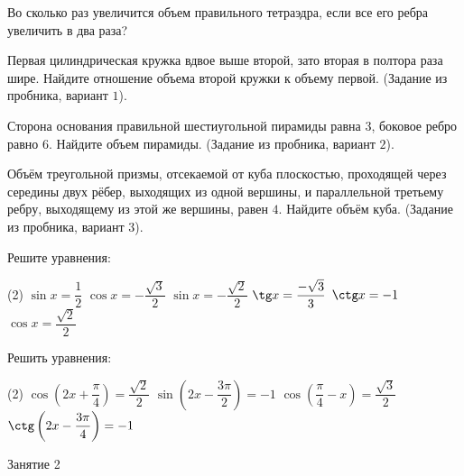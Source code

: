 \begin{class}[number=1]
\begin{listofex}
		\item Во сколько раз увеличится объем правильного тетраэдра, если все его ребра увеличить в два раза?
		\item Первая цилиндрическая кружка вдвое выше второй, зато вторая в полтора раза шире. Найдите отношение объема второй кружки к объему первой. (Задание из пробника, вариант \( 1 \)).
		\item Сторона основания правильной шестиугольной пирамиды равна \( 3 \), боковое ребро равно \( 6 \).	Найдите объем пирамиды. (Задание из пробника, вариант \( 2 \)).
		\item Объём треугольной призмы, отсекаемой от куба плоскостью, проходящей через середины двух рёбер, выходящих из одной вершины, и параллельной третьему ребру, выходящему из	этой же вершины, равен \( 4 \). Найдите объём куба. (Задание из пробника, вариант \( 3 \)).
		\item Решите уравнения:
		\begin{tasks}(2)
			\task \( \sin x=\dfrac{1}{2} \)
			\task \( \cos x=-\dfrac{\sqrt{3}}{2} \)
			\task \( \sin x = -\dfrac{\sqrt{2}}{2} \)
			\task \( \tg x = \dfrac{-\sqrt{3}}{3} \)
			\task \( \ctg x = -1 \)
			\task \( \cos x = \dfrac{\sqrt{2}}{2} \)
		\end{tasks}
		\item Решить уравнения:
		\begin{tasks}(2)
			\task \( \cos\left( 2x+\dfrac{\pi}{4} \right)=\dfrac{\sqrt{2}}{2} \)
			\task \( \sin \left( 2x-\dfrac{3\pi}{2} \right) = -1 \)
			\task \( \cos \left( \dfrac{\pi}{4}-x \right)=\dfrac{\sqrt{3}}{2} \)
			\task \( \ctg\left( 2x-\dfrac{3\pi}{4} \right)=-1 \)
		\end{tasks}
	\end{listofex}
\end{class}

\begin{class}[number=2]
	\begin{listofex}
		\item Занятие 2
	\end{listofex}
\end{class}


